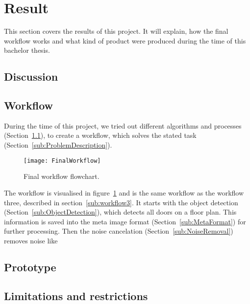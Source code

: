 \section{Result}
This section covers the results of this project. It will explain, how the final workflow works and what kind of product were produced during the time of this bachelor thesis.

\subsection{Discussion}
\label{sub:Discussion}

\subsection{Workflow}
During the time of this project, we tried out different algorithms and processes (Section~\ref{sub:Discussion}), to create a workflow, which solves the stated task (Section~\ref{sub:ProblemDescription}).

\begin{figure}[H]
	\centering
	\texttt{[image: FinalWorkflow]}
	\caption{Final workflow flowchart.}
	\label{fig:FinalWorkflow}
\end{figure}

The workflow is visualised in figure~\ref{fig:FinalWorkflow} and is the same workflow as the workflow three, described in section~\ref{sub:workflow3}. It starts with the object detection (Section~\ref{sub:ObjectDetection}), which detects all doors on a floor plan. This information is saved into the meta image format (Section~\ref{sub:MetaFormat}) for further processing. Then the noise cancelation (Section~\ref{sub:NoiseRemoval}) removes noise like 


\subsection{Prototype}

\subsection{Limitations and restrictions}